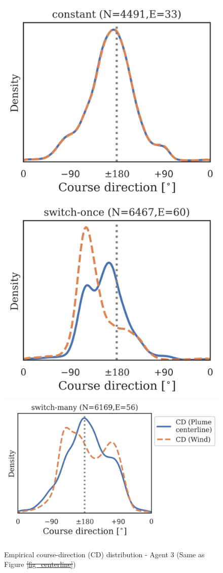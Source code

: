 \documentclass[5p,twocolumn,authoryear]{elsarticle}
\providecommand{\DIFaddtex}[1]{{\protect\color{blue}\uwave{#1}}} %
\providecommand{\DIFdeltex}[1]{{\protect\color{red}\sout{#1}}}                      %
\providecommand{\DIFaddFL}[1]{\DIFadd{#1}} %
\providecommand{\DIFdelFL}[1]{\DIFdel{#1}} %
\providecommand{\DIFaddbeginFL}{} %
\providecommand{\DIFaddendFL}{} %
\providecommand{\DIFdelbeginFL}{} %
\providecommand{\DIFdelendFL}{} %
\providecommand{\DIFadd}[1]{\texorpdfstring{\DIFaddtex{#1}}{#1}} %
\providecommand{\DIFdel}[1]{\texorpdfstring{\DIFdeltex{#1}}{}} %
\newcommand{\DIFscaledelfig}{0.5}
\newlength{\DIFdelgraphicswidth} %
\newlength{\DIFdelgraphicsheight} %
\newcommand{\DIFaddincludegraphics}[2][]{{\color{blue}\fbox{\DIFOincludegraphics[#1]{#2}}}} %
\newcommand{\DIFdelincludegraphics}[2][]{%
\sbox{\DIFdelgraphicsbox}{\DIFOincludegraphics[#1]{#2}}%
\settoboxwidth{\DIFdelgraphicswidth}{\DIFdelgraphicsbox} %
\settoboxtotalheight{\DIFdelgraphicsheight}{\DIFdelgraphicsbox} %
\scalebox{\DIFscaledelfig}{%
\parbox[b]{\DIFdelgraphicswidth}{\usebox{\DIFdelgraphicsbox}\\[-\baselineskip] \rule{\DIFdelgraphicswidth}{0em}}\llap{\resizebox{\DIFdelgraphicswidth}{\DIFdelgraphicsheight}{%
\setlength{\unitlength}{\DIFdelgraphicswidth}%
\begin{picture}(1,1)%
\thicklines\linethickness{2pt} %
{\color[rgb]{1,0,0}\put(0,0){\framebox(1,1){}}}%
{\color[rgb]{1,0,0}\put(0,0){\line( 1,1){1}}}%
{\color[rgb]{1,0,0}\put(0,1){\line(1,-1){1}}}%
\end{picture}%
}\hspace*{3pt}}} %
} %
\DeclareRobustCommand{\DIFaddbeginFL}{\DIFOaddbeginFL \let\includegraphics\DIFaddincludegraphics} %
\DeclareRobustCommand{\DIFaddendFL}{\DIFOaddendFL \let\includegraphics\DIFOincludegraphics} %
\DeclareRobustCommand{\DIFdelbeginFL}{\DIFOdelbeginFL \let\includegraphics\DIFdelincludegraphics} %
\DeclareRobustCommand{\DIFdelendFL}{\DIFOaddendFL \let\includegraphics\DIFOincludegraphics} %
\begin{document}
\begin{figure}[h!]
\centering
\includegraphics[width=0.28\linewidth]{regime_dists_3307e9_constantx5b5_TRACK_CD.png}
\includegraphics[width=0.28\linewidth]{regime_dists_3307e9_switch45x5b5_TRACK_CD.png}
\includegraphics[width=0.405\linewidth]{regime_dists_3307e9_noisy3x5b5_TRACK_CD.png}
\caption[Agent 3: Empirical course-direction (CD) distribution]{ 
Empirical course-direction (CD) distribution - Agent 3 (Same as Figure \DIFdelbeginFL \DIFdelFL{\ref{fig_centerline}}\DIFdelendFL \DIFaddbeginFL \DIFaddFL{\ref{fig_regimes_coursedir}}\DIFaddendFL ) 
}
\end{figure}
\end{document}
